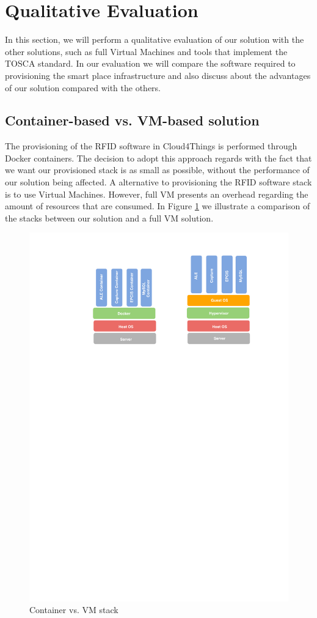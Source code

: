 \section{Qualitative Evaluation}
\label{sec:qualitative_evaluation}
In this section, we will perform a qualitative evaluation of our solution with the other solutions,
such as full Virtual Machines and tools that implement the TOSCA standard. In our evaluation we
will compare the software required to provisioning the smart place infrastructure and also discuss
about the advantages of our solution compared with the others.

\subsection{Container-based vs. VM-based solution}
\label{sub:container_vs_vm_solution}
The provisioning of the RFID software in Cloud4Things is performed through Docker containers. The
decision to adopt this approach regards with the fact that we want our provisioned stack is as
small as possible, without the performance of our solution being affected. A alternative to
provisioning the RFID software stack is to use Virtual Machines. However, full VM presents
an overhead regarding the amount of resources that are consumed. In Figure \ref{fig:container_vs_vm}
we illustrate a comparison of the stacks between our solution and a full VM solution.

\begin{figure}[!ht]
  \centering
  \includegraphics[width=.8\textwidth]{images/container-vs-vm-stack}
  \caption{Container vs. VM stack}
  \label{fig:container_vs_vm}
\end{figure}

